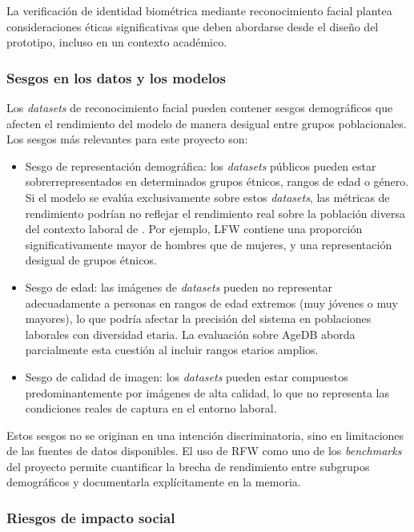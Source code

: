 \documentclass[
  11pt, %
]{charter}
\begin{document}
La verificación de identidad biométrica mediante reconocimiento facial plantea consideraciones éticas significativas que deben abordarse desde el diseño del prototipo, incluso en un contexto académico.

\subsubsection{Sesgos en los datos y los modelos}

Los \textit{datasets} de reconocimiento facial pueden contener sesgos demográficos que afecten el rendimiento del modelo de manera desigual entre grupos poblacionales. Los sesgos más relevantes para este proyecto son:

\begin{itemize}
  \item Sesgo de representación demográfica: los \textit{datasets} públicos pueden estar sobrerrepresentados en determinados grupos étnicos, rangos de edad o género. Si el modelo se evalúa exclusivamente sobre estos \textit{datasets}, las métricas de rendimiento podrían no reflejar el rendimiento real sobre la población diversa del contexto laboral de \empclientename. Por ejemplo, LFW contiene una proporción significativamente mayor de hombres que de mujeres, y una representación desigual de grupos étnicos.
  \item Sesgo de edad: las imágenes de \textit{datasets} pueden no representar adecuadamente a personas en rangos de edad extremos (muy jóvenes o muy mayores), lo que podría afectar la precisión del sistema en poblaciones laborales con diversidad etaria. La evaluación sobre AgeDB aborda parcialmente esta cuestión al incluir rangos etarios amplios.
  \item Sesgo de calidad de imagen: los \textit{datasets} pueden estar compuestos predominantemente por imágenes de alta calidad, lo que no representa las condiciones reales de captura en el entorno laboral.
\end{itemize}

Estos sesgos no se originan en una intención discriminatoria, sino en limitaciones de las fuentes de datos disponibles. El uso de RFW como uno de los \textit{benchmarks} del proyecto permite cuantificar la brecha de rendimiento entre subgrupos demográficos y documentarla explícitamente en la memoria.

\subsubsection{Riesgos de impacto social}
\end{document}
